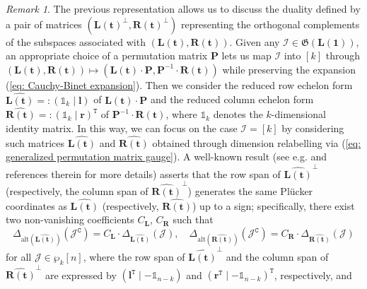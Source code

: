 \documentclass[10pt]{article}
\newcommand{\idd}{\mathbb{1}}
\theoremstyle{remark}%
\newtheorem{rem}{Remark}%
\theoremstyle{definition}%
\begin{document}
\begin{rem}
\label{rem: dual Grassmannian representation} 
The previous representation allows us to discuss the duality defined by a pair of matrices $(\mathbf{L}(\mathbf{t})^{\perp},\mathbf{R}(\mathbf{t})^{\perp})$ representing the orthogonal complements of the subspaces associated with $(\mathbf{L}(\mathbf{t}),\mathbf{R}(\mathbf{t}))$. Given any $\mathcal{I}\in\mathfrak{G}(\mathbf{L}(\mathbf{1}))$, an appropriate choice of a permutation matrix $\mathbf{P}$ lets us map $\mathcal{I}$ into $[k]$ through $(\mathbf{L}(\mathbf{t}),\mathbf{R}(\mathbf{t}))\mapsto(\mathbf{L}(\mathbf{t})\cdot \mathbf{P},\mathbf{P}^{-1}\cdot\mathbf{R}(\mathbf{t}))$ while preserving the expansion (\ref{eq: Cauchy-Binet expansion}).
Then we consider the reduced row echelon form $\mathbf{\widehat{L(\mathbf{t})}}=:(\idd_{k}\mid\mathbf{l})$ of $\mathbf{L}(\mathbf{t})\cdot \mathbf{P}$ and the reduced column echelon form $\mathbf{\widehat{R(\mathbf{t})}}=:(\idd_{k}\mid\mathbf{r})^{\mathtt{T}}$ of $\mathbf{P}^{-1}\cdot\mathbf{R}(\mathbf{t})$, where $\idd_{k}$ denotes the $k$-dimensional identity matrix. In this way, we can focus on the case $\mathcal{I} = [k]$ by considering such matrices $\widehat{\mathbf{L}(\mathbf{t})}$ and $\widehat{\mathbf{R}(\mathbf{t})}$ obtained through dimension relabelling via (\ref{eq: generalized permutation matrix gauge}). A well-known result (see e.g. \citep{Oxley2006,Karp2017} and references therein for more details) asserts that the row span of $\widehat{\mathbf{L}(\mathbf{t})}^{\perp}$ (respectively, the column span of $\widehat{\mathbf{R}(\mathbf{t})}^{\perp}$) generates the same Pl\"{u}cker coordinates as $\mathbf{\widehat{L(\mathbf{t})}}$ (respectively, $\mathbf{\widehat{R(\mathbf{t})}}$) up to a sign; specifically, there exist two non-vanishing coefficients $C_{\mathbf{L}}$, $C_{\mathbf{R}}$ such that  
\begin{equation*}
\Delta_{\mathrm{alt}(\mathbf{\widehat{L(\mathbf{t})}})}(\mathcal{J}^{\mathtt{C}}) = C_{\mathbf{L}}\cdot\Delta_{\widehat{\mathbf{L}(\mathbf{t})}}(\mathcal{J}),
\quad 
\Delta_{\mathrm{alt}(\mathbf{\widehat{R(\mathbf{t})}})}(\mathcal{J}^{\mathtt{C}}) = C_{\mathbf{R}}\cdot\Delta_{\widehat{\mathbf{R}(\mathbf{t})}}(\mathcal{J})
\end{equation*}
for all $\mathcal{J}\in\wp_{k}[n]$, where the row span of $\widehat{\mathbf{L}(\mathbf{t})}^{\perp}$ and the column span of $\widehat{\mathbf{R}(\mathbf{t})}^{\perp}$ are expressed by $(\mathbf{l}^{\mathtt{T}}\mid -\idd_{n-k})$ and $(\mathbf{r}^{\mathtt{T}}\mid -\idd_{n-k})^{\mathtt{T}}$, respectively, and 

\end{rem}
\end{document}
